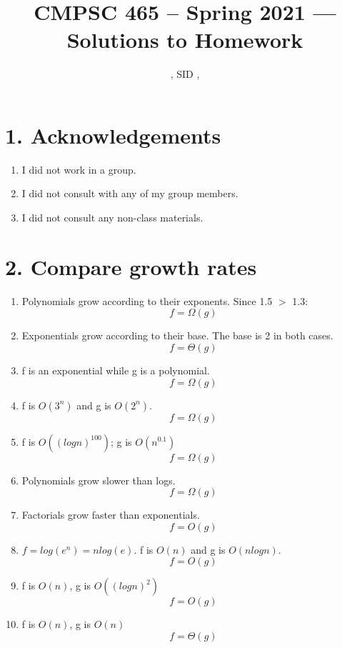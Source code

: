 \documentclass[11pt]{article}
\title{CMPSC 465 -- Spring 2021 --- Solutions to Homework \Homework}
\author{\Name, SID \SID, \texttt{\Login}}
\newenvironment{qparts}{\begin{enumerate}[{(}a{)}]}{\end{enumerate}}
\begin{document}
\maketitle

\section*{1. Acknowledgements}
\begin{qparts}
\item
I did not work in a group.
\item
I did not consult with any of my group members.
\item
I did not consult any non-class materials.
\end{qparts}



\newpage
\section*{2. Compare growth rates}
\begin{qparts}
\item
Polynomials grow according to their exponents. Since 1.5 $>$ 1.3: $$f = \Omega (g)$$

\item
Exponentials grow according to their base. The base is 2 in both cases. 
$$f = \Theta(g)$$

\item
f is an exponential while g is a polynomial. 
$$f = \Omega (g)$$

\item
f is $O(3^n)$ and g is $O(2^n)$.
$$f = \Omega(g)$$

\item
f is $O((logn)^100)$; g is $O(n^0.1)$
$$f = \Omega(g)$$

\item
Polynomials grow slower than logs. 
$$f = \Omega(g)$$

\item
Factorials grow faster than exponentials. 
$$f = O(g)$$

\item
$f = log(e^n) = nlog(e)$. f is $O(n)$ and g is $O(nlogn)$. 
$$f = O(g)$$

\item
f is $O(n)$, g is $O((logn)^2)$
$$f = O(g)$$

\item
f is $O(n)$, g is $O(n)$
$$f = \Theta(g)$$

\end{qparts}
\end{document}
